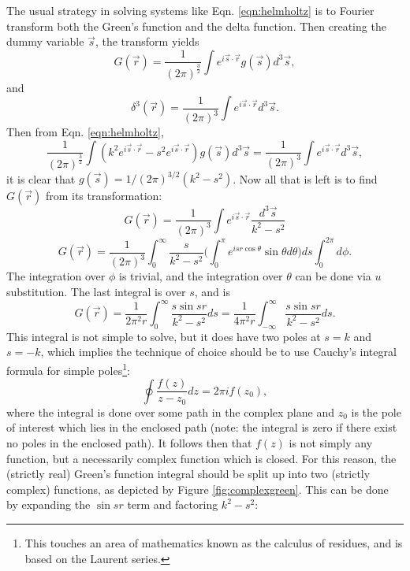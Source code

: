 The usual strategy in solving systems like Eqn. \ref{eqn:helmholtz} is to Fourier transform both the Green's function and the delta function. Then creating the dummy variable $\vec{s}$, the transform yields
%
\begin{equation} \nonumber
G(\vec{r})=\frac{1}{(2\pi)^\frac{3}{2}}\int e^{i\vec{s}\cdot\vec{r}} g(\vec{s})d^3\vec{s},
\end{equation}
and
%
\begin{equation} \nonumber
\delta^3(\vec{r})=\frac{1}{(2\pi)^3}\int e^{i\vec{s}\cdot\vec{r}} d^3\vec{s}.
\end{equation}
Then from Eqn. \ref{eqn:helmholtz},
%
\begin{equation} \nonumber
\frac{1}{(2\pi)^\frac{3}{2}}\int (k^2e^{i\vec{s}\cdot\vec{r}}-s^2e^{i\vec{s}\cdot\vec{r}})g(\vec{s})d^3\vec{s}=\frac{1}{(2\pi)^3}\int e^{i\vec{s}\cdot\vec{r}}d^3\vec{s},
\end{equation}
it is clear that $g(\vec{s})=1/(2\pi)^{3/2}(k^2-s^2)$. Now all that is left is to find $G(\vec{r})$ from its transformation:
%
\begin{equation} \nonumber
G(\vec{r})=\frac{1}{(2\pi)^3}\int e^{i\vec{s}\cdot\vec{r}}\frac{d^3\vec{s}}{k^2-s^2}
\end{equation}
%
\begin{equation} \nonumber
G(\vec{r})=\frac{1}{(2\pi)^3}\int_0^\infty \frac{s}{k^2-s^2} \big(\int_0^\pi e^{isr\cos\theta}\sin\theta d\theta\big)ds \int_0^{2\pi}d\phi.
\end{equation}
The integration over $\phi$ is trivial, and the integration over $\theta$ can be done via $u$ substitution. The last integral is over $s$, and is
%
\begin{equation} \nonumber
G(\vec{r})=\frac{1}{2\pi^2r}\int_0^\infty\frac{s\sin{sr}}{k^2-s^2}ds=\frac{1}{4\pi^2r}\int_{-\infty}^\infty\frac{s\sin{sr}}{k^2-s^2}ds.
\end{equation}
This integral is not simple to solve, but it does have two poles at $s=k$ and $s=-k$, which implies the technique of choice should be to use Cauchy's integral formula for simple poles\footnote{This touches an area of mathematics known as the calculus of residues, and is based on the Laurent series.}:
%
\begin{equation}
\label{eqn:cauchy}
\oint \frac{f(z)}{z-z_0}dz=2\pi if(z_0),
\end{equation}
where the integral is done over some path in the complex plane and $z_0$ is the pole of interest which lies in the enclosed path (note: the integral is zero if there exist no poles in the enclosed path). It follows then that $f(z)$ is not simply any function, but a necessarily complex function which is closed. For this reason, the (strictly real) Green's function integral should be split up into two (strictly complex) functions, as depicted by Figure \ref{fig:complexgreen}. This can be done by expanding the $\sin sr$ term and factoring $k^2-s^2$:
